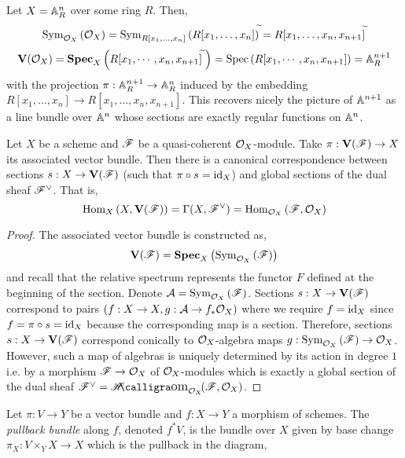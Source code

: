 \documentclass[12pt]{article}
\begin{document}
\begin{example}
Let $X = \mathbb{A}^n_R$ over some ring $R$. Then,
\[ \mathrm{Sym}_{\mathcal{O}_{X}}\left( \mathcal{O}_{X} \right) = \mathrm{Sym}_{R[x_1, \dots, x_n]}\left(R[x_1, \dots, x_n]\right)^{\widetilde{}} = R[x_1, \dots, x_n, x_{n+1}]^{\widetilde{}} \]
\[ \mathbf{V}(\mathcal{O}_{X}) = \mathbf{Spec}_{X}\left( R[x_1, \cdots, x_n, x_{n+1}]^{\widetilde{}} \:  \right) = \mathrm{Spec}\left( R[x_1, \cdots, x_n, x_{n+1}] \right) = \mathbb{A}^{n+1}_R \]
with the projection $\pi : \mathbb{A}^{n+1}_R \to \mathbb{A}^n_R$ induced by the embedding $R[x_1, \dots, x_n] \to R[x_1, \dots, x_n, x_{n+1}]$. This recovers nicely the picture of $\mathbb{A}^{n+1}$ as a line bundle over $\mathbb{A}^n$ whose sections are exactly regular functions on $\mathbb{A}^n$. 
\end{example}

\begin{lemma}
Let $X$ be a scheme and $\mathscr{F}$ be a quasi-coherent $\mathcal{O}_{X}$-module. Take $\pi : \mathbf{V}(\mathscr{F}) \to X$ its associated vector bundle. Then there is a canonical correspondence between sections $s : X \to \mathbf{V}(\mathscr{F})$ (such that $\pi \circ s = \mathrm{id}_X$) and global sections of the dual sheaf $\mathscr{F}^\vee$. That is,
\[ \mathrm{Hom}_{X} \left( X, \mathbf{V}(\mathscr{F}) \right) = \Gamma(X, \mathscr{F}^\vee) = \mathrm{Hom}_{\mathcal{O}_{X}} \left( \mathscr{F}, \mathcal{O}_{X} \right) \]
\end{lemma}

\begin{proof}
The associated vector bundle is constructed as,
\[ \mathbf{V}(\mathscr{F}) = \mathbf{Spec}_{X}\left( \mathrm{Sym}_{\mathcal{O}_{X}}\left( \mathscr{F} \right) \right) \]
and recall that the relative spectrum represents the functor $F$ defined at the beginning of the section. Denote $\mathcal{A} = \mathrm{Sym}_{\mathcal{O}_{X}}\left( \mathscr{F} \right)$. Sections $s : X \to \mathbf{V}(\mathscr{F})$ correspond to pairs $(f : X \to X, g : \mathcal{A} \to f_* \mathcal{O}_{X})$ where we require $f = \mathrm{id}_X$ since $f = \pi \circ s = \mathrm{id}_X$ because the corresponding map is a section. Therefore, sections $s : X \to \mathbf{V}(\mathscr{F})$ correspond conically to $\mathcal{O}_{X}$-algebra maps $g : \mathrm{Sym}_{\mathcal{O}_{X}}\left( \mathscr{F} \right) \to \mathcal{O}_{X}$. However, such a map of algebras is uniquely determined by its action in degree $1$ i.e. by a morphism $\mathscr{F} \to \mathcal{O}_{X}$ of $\mathcal{O}_{X}$-modules which is exactly a global section of the dual sheaf $\F^\vee = \shHomover{\struct{X}}{\F}{\struct{X}}$.
\end{proof}

\begin{definition}
Let $\pi : V \to Y$ be a vector bundle and $f : X \to Y$ a morphism of schemes. The \textit{pullback bundle} along $f$, denoted $f^* V$, is the bundle over $X$ given by base change $\pi_X : V \times_Y X \to X$ which is the pullback in the diagram,
\begin{center}
\end{center}
\end{definition}
\end{document}

